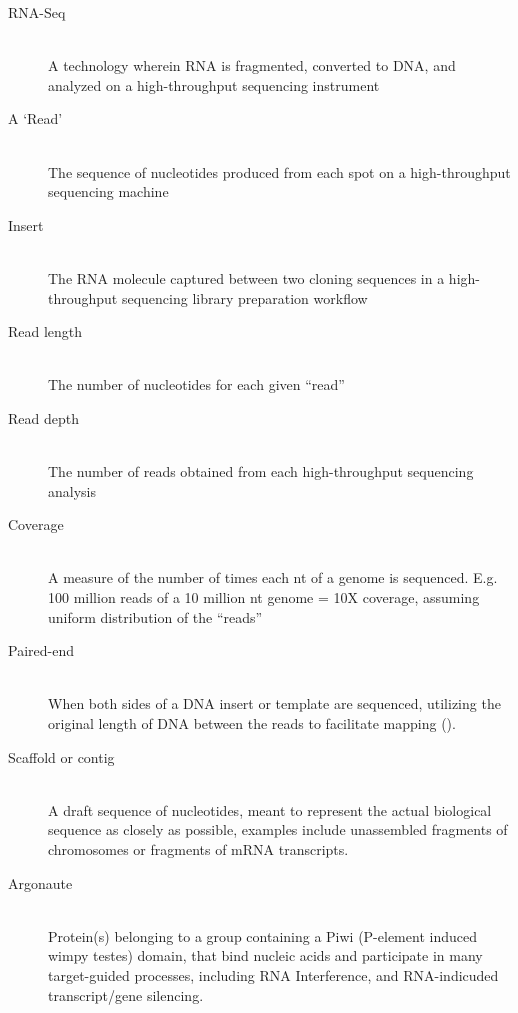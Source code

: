 \clearpage 
{}
\label{hd:Definitions} \listDefinitions

\begin{description}
  \item[RNA-Seq] \hfill \\
  A technology wherein RNA is fragmented, converted to DNA, and analyzed on a high-throughput sequencing instrument

  \item[A ‘Read’] \hfill \\
  The sequence of nucleotides produced from each spot on a high-throughput sequencing machine

  \item[Insert] \hfill \\
  The RNA molecule captured between two cloning sequences in a high-throughput sequencing library preparation workflow

  \item[Read length] \hfill \\
  The number of nucleotides for each given ``read''

  \item[Read depth] \hfill \\
  The number of reads obtained from each high-throughput sequencing analysis

  \item[Coverage] \hfill \\
  A measure of the number of times each nt of a genome is sequenced. E.g. 100 million reads of a 10 million nt genome = 10X coverage, assuming uniform distribution of the ``reads''

  \item[Paired-end] \hfill \\
  When both sides of a DNA insert or template are sequenced, utilizing the original length of DNA between the reads to facilitate mapping (\cite{Roach1995}).

  \item[Scaffold or contig] \hfill \\
  A draft sequence of nucleotides, meant to represent the actual biological sequence as closely as possible, examples include unassembled fragments of chromosomes or fragments of mRNA transcripts.

  \item[Argonaute] \hfill \\
  Protein(s) belonging to a group containing a Piwi (P-element induced wimpy testes) domain, that bind nucleic acids and participate in many target-guided processes, including RNA Interference, and RNA-indicuded transcript/gene silencing.


\end{description}
